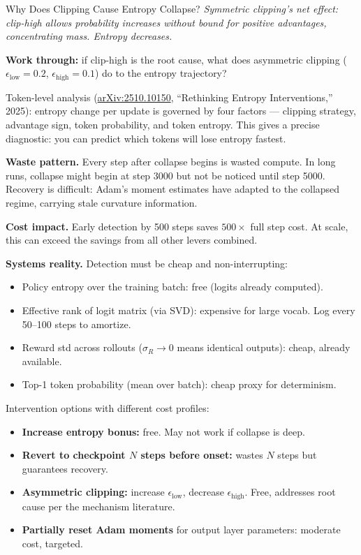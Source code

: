 \begin{thinkfirst}{Why Does Clipping Cause Entropy Collapse?}
\smallskip
\noindent\textit{Symmetric clipping's net effect: clip-high allows probability increases without bound for positive advantages, concentrating mass. Entropy decreases.}

\textbf{Work through:} if clip-high is the root cause, what does asymmetric clipping ($\epsilon_{\mathrm{low}} = 0.2$, $\epsilon_{\mathrm{high}} = 0.1$) do to the entropy trajectory?
\end{thinkfirst}

Token-level analysis (\href{https://arxiv.org/abs/2510.10150}{arXiv:2510.10150}, ``Rethinking Entropy Interventions,'' 2025): entropy change per update is governed by four factors --- clipping strategy, advantage sign, token probability, and token entropy. This gives a precise diagnostic: you can predict which tokens will lose entropy fastest.

\textbf{Waste pattern.} Every step after collapse begins is wasted compute. In long runs, collapse might begin at step 3000 but not be noticed until step 5000. Recovery is difficult: Adam's moment estimates have adapted to the collapsed regime, carrying stale curvature information.

\textbf{Cost impact.} Early detection by 500 steps saves $500 \times$ full step cost. At scale, this can exceed the savings from all other levers combined.

\textbf{Systems reality.} Detection must be cheap and non-interrupting:
\begin{itemize}
  \item Policy entropy over the training batch: free (logits already computed).
  \item Effective rank of logit matrix (via SVD): expensive for large vocab. Log every 50--100 steps to amortize.
  \item Reward std across rollouts ($\sigma_R \to 0$ means identical outputs): cheap, already available.
  \item Top-1 token probability (mean over batch): cheap proxy for determinism.
\end{itemize}

Intervention options with different cost profiles:
\begin{itemize}
  \item \textbf{Increase entropy bonus:} free. May not work if collapse is deep.
  \item \textbf{Revert to checkpoint $N$ steps before onset:} wastes $N$ steps but guarantees recovery.
  \item \textbf{Asymmetric clipping:} increase $\epsilon_{\mathrm{low}}$, decrease $\epsilon_{\mathrm{high}}$. Free, addresses root cause per the mechanism literature.
  \item \textbf{Partially reset Adam moments} for output layer parameters: moderate cost, targeted.
\end{itemize}

